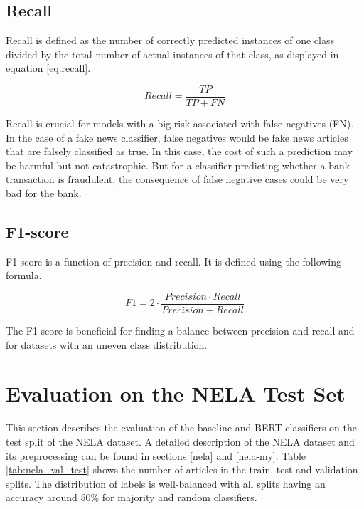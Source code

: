 \subsection*{Recall}
Recall is defined as the number of correctly predicted instances of one class divided by the total number of actual instances of that class, as displayed in equation \ref{eq:recall}.

\begin{equation}
    \label{eq:recall}
    Recall = \displaystyle{\frac{TP}{TP + FN}}
\end{equation}

Recall is crucial for models with a big risk associated with false negatives (FN). In the case of a fake news classifier, false negatives would be fake news articles that are falsely classified as true. In this case, the cost of such a prediction may be harmful but not catastrophic. But for a classifier predicting whether a bank transaction is fraudulent, the consequence of false negative cases could be very bad for the bank.

\subsection*{F1-score}
F1-score is a function of precision and recall. It is defined using the following formula.

\begin{equation}
    F1 = 2 \cdot \displaystyle{\frac{Precision \cdot Recall}{Precision + Recall}}
\end{equation}

The F1 score is beneficial for finding a balance between precision and recall and for datasets with an uneven class distribution.



\section{Evaluation on the NELA Test Set}
\label{sec:eval_nela}
This section describes the evaluation of the baseline and BERT classifiers on the test split of the NELA  dataset. A detailed description of the NELA dataset and its preprocessing can be found in sections \ref{nela} and \ref{nela-my}. Table \ref{tab:nela_val_test} shows the number of articles in the train, test and validation splits. The distribution of labels is well-balanced with all splits having an accuracy around 50\% for majority and random classifiers.

